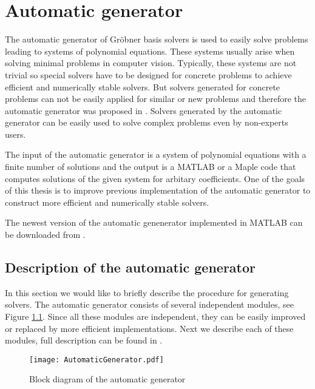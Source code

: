 \chapter{Automatic generator}
The automatic generator of Gr\"obner basis solvers is used to easily solve problems leading to systems of polynomial equations. These systems usually arise when solving minimal problems \cite{MinimalProblems} in computer vision. Typically, these systems are not trivial so special solvers have to be designed for concrete problems to achieve efficient and numerically stable solvers. But solvers generated for concrete problems can not be easily applied for similar or new problems and therefore the automatic generator was proposed in \cite{AutoGen}. Solvers generated by the automatic generator can be easily used to solve complex problems even by non-experts users.

The input of the automatic generator is a system of polynomial equations with a finite number of solutions and the output is a MATLAB or a Maple code that computes solutions of the given system for arbitary coefficients. One of the goals of this thesis is to improve previous implementation \cite{AutoGen} of the automatic generator to construct more efficient and numerically stable solvers.

The newest version of the automatic genenerator implemented in MATLAB can be downloaded from \cite{AutomaticGenerator}.

\section{Description of the automatic generator}
In this section we would like to briefly describe the procedure for generating solvers. The automatic generator consists of several independent modules, see Figure \ref{autogen:blockDiagram}. Since all these modules are independent, they can be easily improved or replaced by more efficient implementations. Next we describe each of these modules, full description can be found in \cite{AutoGen}.

\begin{figure}[ht]
  \centering
  \texttt{[image: AutomaticGenerator.pdf]}
  \caption{Block diagram of the automatic generator}
  \label{autogen:blockDiagram}
\end{figure}

